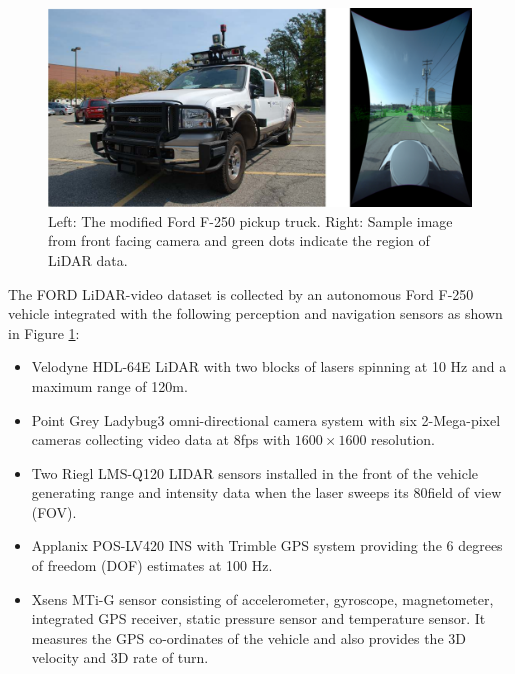 \documentclass{article}
\begin{document}
\begin{figure}[htbp]
    \centering
        \includegraphics[scale=0.45]{ford_truck_sensor.pdf}
    \caption{Left: The modified Ford F-250 pickup truck. Right: Sample image from front facing camera and green dots indicate the region of LiDAR data.}
    \label{fig:ford-truck-sensors}
\end{figure}

The FORD LiDAR-video dataset \cite{Pandey2011Ford-Campu} is collected by an autonomous Ford F-250 vehicle integrated with the following perception and navigation sensors as shown in Figure \ref{fig:ford-truck-sensors}:
\begin{itemize}
    \item Velodyne HDL-64E LiDAR with two blocks of lasers spinning at 10 Hz and a maximum range of 120m.
    \item Point Grey Ladybug3 omni-directional camera system with six 2-Mega-pixel cameras collecting video data at 8fps with $1600\times1600$ resolution.
    \item Two Riegl LMS-Q120 LIDAR sensors installed in the front of the vehicle generating range and intensity data when the laser sweeps its 80\degree field of view (FOV).
    \item Applanix POS-LV420 INS with Trimble GPS system providing the 6 degrees of freedom (DOF) estimates at 100 Hz.
    \item Xsens MTi-G sensor consisting of accelerometer, gyroscope, magnetometer, integrated GPS receiver, static pressure sensor and temperature sensor. It measures the GPS co-ordinates of the vehicle and also provides the 3D velocity and 3D rate of turn.
\end{itemize}
\end{document}
